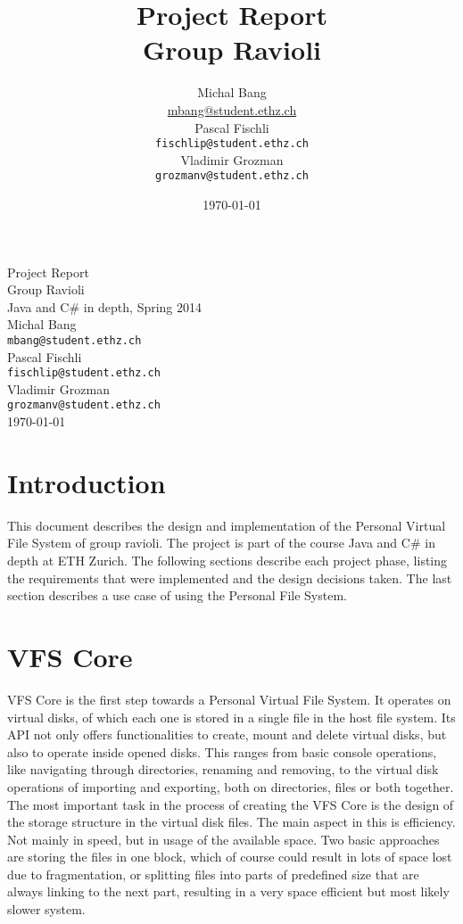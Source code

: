 \documentclass[11pt]{article}
\title{Project Report\\Group Ravioli}
\author{\large Michal Bang\\\small\href{mailto:mbang@student.ethz.ch}{mbang@student.ethz.ch}\\\large Pascal Fischli\\\small\texttt{fischlip@student.ethz.ch}\\\large Vladimir Grozman\\\small\texttt{grozmanv@student.ethz.ch}}
\date{\today}
\begin{document}
\begin{center}



\LARGE Project Report\\Group Ravioli \\[0.5cm]

\Large Java and C\# in depth, Spring 2014 \\[0.5cm]

\large Michal Bang\\\small\texttt{mbang@student.ethz.ch}\\[0.05cm]
\large Pascal Fischli\\\small\texttt{fischlip@student.ethz.ch}\\[0.05cm]
\large Vladimir Grozman\\\small\texttt{grozmanv@student.ethz.ch}\\[0.5cm]

{\large \today}\\[1.5cm]

\end{center}


\section{Introduction}
    This document describes the design and implementation of the Personal Virtual File System of group ravioli. The project is part of the course Java and C\# in depth at ETH Zurich. The following sections describe each project phase, listing the requirements that were implemented and the design decisions taken. The last section describes a use case of using the Personal File System.

\section{VFS Core}
    VFS Core is the first step towards a Personal Virtual File System. It operates on virtual disks, of which each one is stored in a single file in the host file system. Its API not only offers functionalities to create, mount and delete virtual disks, but also to operate inside opened disks. This ranges from basic console operations, like navigating through directories, renaming and removing, to the virtual disk operations of importing and exporting, both on directories, files or both together.\newline
    The most important task in the process of creating the VFS Core is the design of the storage structure in the virtual disk files. The main aspect in this is efficiency. Not mainly in speed, but in usage of the available space. Two basic approaches are storing the files in one block, which of course could result in lots of space lost due to fragmentation, or splitting files into parts of predefined size that are always linking to the next part, resulting in a very space efficient but most likely slower system.
\end{document}
